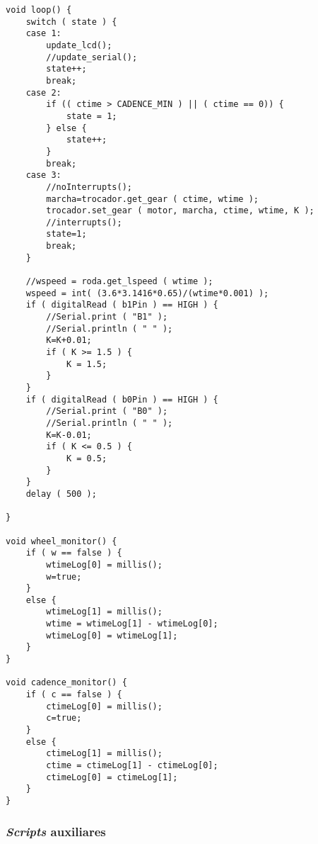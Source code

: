 \documentclass[a4paper,11pt]{article}
\begin{document}
\begin{lstlisting}
void loop() {
    switch ( state ) {
    case 1:
        update_lcd();
        //update_serial();
        state++;
        break;
    case 2:      
        if (( ctime > CADENCE_MIN ) || ( ctime == 0)) {
            state = 1;
        } else {
            state++;
        }
        break;
    case 3:
        //noInterrupts();
        marcha=trocador.get_gear ( ctime, wtime );
        trocador.set_gear ( motor, marcha, ctime, wtime, K );
        //interrupts();
        state=1;
        break;
    }

    //wspeed = roda.get_lspeed ( wtime );
    wspeed = int( (3.6*3.1416*0.65)/(wtime*0.001) );
    if ( digitalRead ( b1Pin ) == HIGH ) {
        //Serial.print ( "B1" );
        //Serial.println ( " " );
        K=K+0.01;
        if ( K >= 1.5 ) {
            K = 1.5;
        }
    }
    if ( digitalRead ( b0Pin ) == HIGH ) {
        //Serial.print ( "B0" );
        //Serial.println ( " " );
        K=K-0.01;
        if ( K <= 0.5 ) {
            K = 0.5;
        }
    }
    delay ( 500 );

}

void wheel_monitor() {
    if ( w == false ) {
        wtimeLog[0] = millis();
        w=true;
    }
    else {
        wtimeLog[1] = millis();
        wtime = wtimeLog[1] - wtimeLog[0];
        wtimeLog[0] = wtimeLog[1];
    }
}

void cadence_monitor() {
    if ( c == false ) {
        ctimeLog[0] = millis();
        c=true;
    }
    else {
        ctimeLog[1] = millis();
        ctime = ctimeLog[1] - ctimeLog[0];
        ctimeLog[0] = ctimeLog[1];
    }
}
\end{lstlisting}

\subsubsection{\textit{Scripts} auxiliares}
\label{code: helper_scripts}

\end{document}
